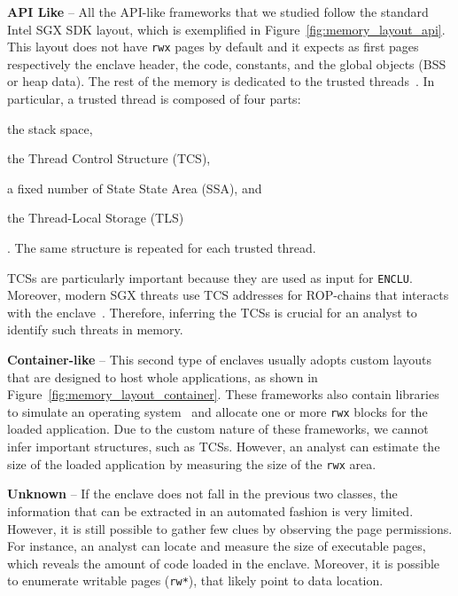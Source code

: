 \vspace{0.2cm}
\noindent \textbf{API Like} -- All the API-like frameworks that we studied 
follow the
standard Intel SGX SDK layout, which is exemplified in
Figure~\ref{fig:memory_layout_api}. This layout does not have \texttt{rwx}
pages by default and it expects as first pages respectively the enclave header, 
the code,
constants, and the global objects (\eg BSS or heap data). The rest of
the memory is dedicated to the trusted threads~\citep{intel-developer-guide}. In
particular, a trusted thread is composed of four parts:
\begin{enumerate*}[label=(\roman*)]
	\item the stack space,
	\item the Thread Control Structure (TCS),
	\item a fixed number of State State Area (SSA), and
	\item the Thread-Local Storage (TLS)
\end{enumerate*}.
The same structure is repeated for each trusted thread.

TCSs are particularly important because they are used as input for
\texttt{ENCLU}. Moreover, modern SGX threats use TCS addresses for ROP-chains 
that interacts with the enclave~\citep{snakegx}. 
Therefore, inferring the TCSs is crucial for an analyst to identify such 
threats in memory.

\vspace{0.2cm}
\noindent \textbf{Container-like} -- This second type of enclaves usually 
adopts custom layouts
that are designed to host whole applications, as shown in
Figure~\ref{fig:memory_layout_container}. These frameworks also contain
libraries to simulate an operating system~\citep{tsai2017graphene} and allocate 
one or more \texttt{rwx} blocks for the loaded application.
Due to the custom nature of these frameworks, we cannot infer important
structures, such as TCSs. However, an analyst can estimate the size of the 
loaded application
by measuring the size of the \texttt{rwx} area.

\vspace{0.2cm}
\noindent \textbf{Unknown} -- 
If the enclave does not fall in the previous two classes, the information that 
can be
extracted in an automated fashion is very limited. However, it is still 
possible to gather
few clues by observing the page permissions.
For instance, an analyst can locate and measure the size of executable pages, 
which reveals 
the amount of code loaded in the enclave.
Moreover, it is possible to enumerate writable pages (\ie \texttt{rw*}), that 
likely point to data
location.

